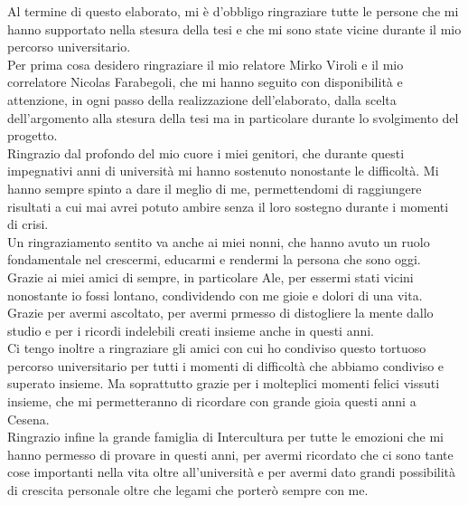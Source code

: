 \documentclass[12pt,a4paper,openright,twoside]{book}
\begin{document}

\backmatter

\nocite{*}



\begin{acknowledgements}
    Al termine di questo elaborato, mi è d'obbligo ringraziare tutte le persone che mi hanno supportato nella stesura della tesi e che mi sono state vicine 
    durante il mio percorso universitario.\\
    Per prima cosa desidero ringraziare il mio relatore Mirko Viroli e il mio correlatore Nicolas Farabegoli, che mi hanno seguito con disponibilità e attenzione,
    in ogni passo della realizzazione dell'elaborato, dalla scelta dell'argomento alla stesura della tesi ma in particolare durante lo svolgimento del progetto.\\
    Ringrazio dal profondo del mio cuore i miei genitori, che durante questi impegnativi anni di università mi hanno sostenuto nonostante le difficoltà.
    Mi hanno sempre spinto a dare il meglio di me, permettendomi di raggiungere risultati a cui mai avrei potuto ambire senza il loro sostegno durante i momenti di crisi.\\
    Un ringraziamento sentito va anche ai miei nonni, che hanno avuto un ruolo fondamentale nel crescermi, educarmi e rendermi la persona che sono oggi.\\
    Grazie ai miei amici di sempre, in particolare Ale, per essermi stati vicini nonostante io fossi lontano, condividendo con me gioie e dolori di una vita.
    Grazie per avermi ascoltato, per avermi prmesso di distogliere la mente dallo studio e per i ricordi indelebili creati insieme anche in questi anni.\\
    Ci tengo inoltre a ringraziare gli amici con cui ho condiviso questo tortuoso percorso universitario per tutti i momenti di difficoltà che abbiamo condiviso e superato insieme.
    Ma soprattutto grazie per i molteplici momenti felici vissuti insieme, che mi permetteranno di ricordare con grande gioia questi anni a Cesena.\\
    Ringrazio infine la grande famiglia di Intercultura per tutte le emozioni che mi hanno permesso di provare in questi anni, per avermi ricordato che ci sono tante cose 
    importanti nella vita oltre all'università e per avermi dato grandi possibilità di crescita personale oltre che legami che porterò sempre con me.
\end{acknowledgements}
\end{document}
